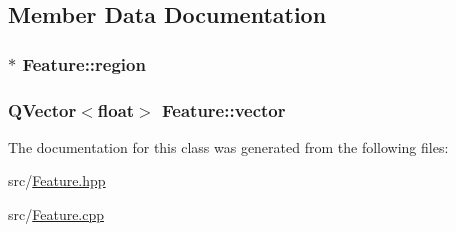\subsection{Member Data Documentation}
\hypertarget{class_feature_a134c6b5022108c2a1000c7c88c40f352}{
\subsubsection[{region}]{$\ast$ Feature\+::region\hspace{0.3cm}{\ttfamily [protected]}}}\label{class_feature_a134c6b5022108c2a1000c7c88c40f352}
\hypertarget{class_feature_a8158dfca752942aeb84f35c363184d95}{
\subsubsection[{vector}]{\setlength{\rightskip}{0pt plus 5cm}Q\+Vector$<$float$>$ Feature\+::vector\hspace{0.3cm}{\ttfamily [protected]}}}\label{class_feature_a8158dfca752942aeb84f35c363184d95}


The documentation for this class was generated from the following files\+:\begin{DoxyCompactItemize}
\item 
src/\hyperlink{_feature_8hpp}{Feature.\+hpp}\item 
src/\hyperlink{_feature_8cpp}{Feature.\+cpp}\end{DoxyCompactItemize}
